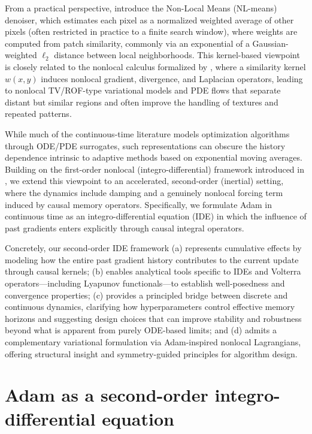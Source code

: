 \documentclass{article} %
\begin{document}
From a practical perspective, \cite{buades_denoising} introduce the Non-Local Means (NL-means) denoiser, which estimates each pixel as a normalized weighted average of other pixels (often restricted in practice to a finite search window), where weights are computed from patch similarity, commonly via an exponential of a Gaussian-weighted $\ell_2$ distance between local neighborhoods. This kernel-based viewpoint is closely related to the nonlocal calculus formalized by \cite{nonlocal_image}, where a similarity kernel \(w(x,y)\) induces nonlocal gradient, divergence, and Laplacian operators, leading to nonlocal TV/ROF-type variational models and PDE flows that separate distant but similar regions and often improve the handling of textures and repeated patterns.

\vspace{0.5cm}
While much of the continuous-time literature models optimization algorithms through ODE/PDE surrogates, such representations can obscure the history dependence intrinsic to adaptive methods based on exponential moving averages. Building on the first-order nonlocal (integro-differential) framework introduced in \citet{heredia2025modelingadagradrmspropadam}, we extend this viewpoint to an accelerated, second-order (inertial) setting, where the dynamics include damping and a genuinely nonlocal forcing term induced by causal memory operators. Specifically, we formulate Adam in continuous time as an integro-differential equation (IDE) in which the influence of past gradients enters explicitly through causal integral operators.

Concretely, our second-order IDE framework (a) represents cumulative effects by modeling how the entire past gradient history contributes to the current update through causal kernels; (b) enables analytical tools specific to IDEs and Volterra operators---including Lyapunov functionals---to establish well-posedness and convergence properties; (c) provides a principled bridge between discrete and continuous dynamics, clarifying how hyperparameters control effective memory horizons and suggesting design choices that can improve stability and robustness beyond what is apparent from purely ODE-based limits; and (d) admits a complementary variational formulation via Adam-inspired nonlocal Lagrangians, offering structural insight and symmetry-guided principles for algorithm design.

\section{Adam as a second-order integro-differential equation}\label{Sec:Adam-dynamics}
\end{document}
